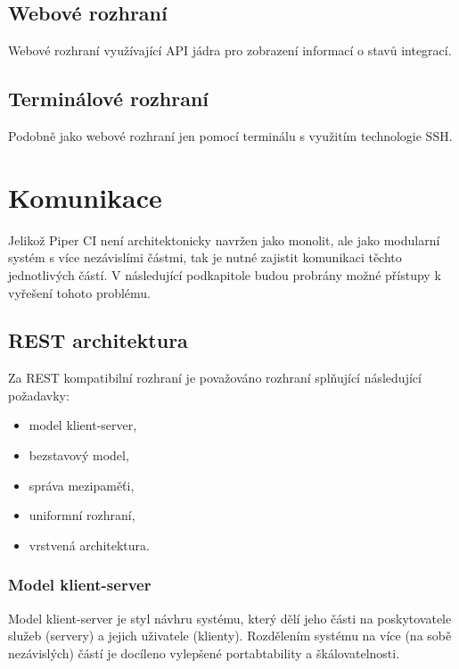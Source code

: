\subsection{Webové rozhraní}

Webové rozhraní využívající API jádra pro zobrazení informací o stavů integrací.

\subsection{Terminálové rozhraní}

Podobně jako webové rozhraní jen pomocí terminálu s využitím technologie SSH.

\section{Komunikace}

Jelikož Piper CI není architektonicky navržen jako monolit, ale jako modularní systém s více nezávislími částmi, tak je nutné zajistit komunikaci těchto jednotlivých částí.
V následující podkapitole budou probrány možné přístupy k vyřešení tohoto problému.

\subsection{REST architektura}

Za REST kompatibilní rozhraní je považováno rozhraní splňující následující požadavky:

\begin{itemize}
	\item model klient-server,
	\item bezstavový model,
	\item správa mezipaměťi,
	\item uniformní rozhraní,
	\item vrstvená architektura. \cite{rest}
\end{itemize}

\subsubsection{Model klient-server}

Model klient-server je styl návhru systému, který dělí jeho části na poskytovatele služeb (servery) a jejich uživatele (klienty).
Rozdělením systému na více (na sobě nezávislých) částí je docíleno vylepšené portabtability a škálovatelnosti.
\cite{rest_klient_server}

